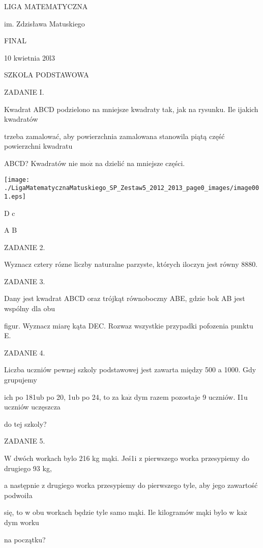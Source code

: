\documentclass[a4paper,12pt]{article}
\begin{document}
LIGA MATEMATYCZNA

im. Zdzisława Matuskiego

FINAL

10 kwietnia 20l3

SZKOLA PODSTAWOWA

ZADANIE I.

Kwadrat ABCD podzielono na mniejsze kwadraty tak, jak na rysunku. Ile ijakich kwadratów

trzeba zamalować, aby powierzchnia zamalowana stanowila piątą część powierzchni kwadratu

ABCD? Kwadratów nie $\mathrm{m}\mathrm{o}\dot{\mathrm{z}}$ na dzielić na mniejsze części.
\begin{center}
\texttt{[image: ./LigaMatematycznaMatuskiego\_SP\_Zestaw5\_2012\_2013\_page0\_images/image001.eps]}
\end{center}
D  c

A  B

ZADANIE 2.

Wyznacz cztery rózne liczby naturalne parzyste, których iloczyn jest równy 8880.

ZADANIE 3.

Dany jest kwadrat ABCD oraz trójkąt równoboczny ABE, gdzie bok AB jest wspólny dla obu

figur. Wyznacz miarę kąta DEC. Rozwaz wszystkie przypadki pofozenia punktu E.

ZADANIE 4.

Liczba uczniów pewnej szkoly podstawowej jest zawarta między 500 a 1000. Gdy grupujemy

ich po 181ub po 20, 1ub po 24, to za $\mathrm{k}\mathrm{a}\dot{\mathrm{z}}$ dym razem pozostaje 9 uczniów. I1u uczniów uczęszcza

do tej szkoly?

ZADANIE 5.

$\mathrm{W}$ dwóch workach bylo 216 kg mąki. Jeś1i z pierwszego worka przesypiemy do drugiego 93 kg,

a następnie z drugiego worka przesypiemy do pierwszego tyle, aby jego zawartość podwoiła

się, to w obu workach będzie tyle samo mąki. Ile kilogramów mąki bylo w $\mathrm{k}\mathrm{a}\dot{\mathrm{z}}$ dym worku

na początku?
\end{document}
